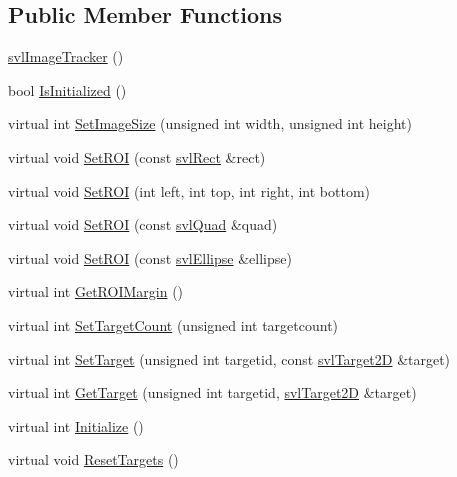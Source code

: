 \subsection*{Public Member Functions}
\begin{DoxyCompactItemize}
\item 
\hyperlink{classsvl_image_tracker_ab130e149fbc53c12361f616549f84c46}{svl\-Image\-Tracker} ()
\item 
bool \hyperlink{classsvl_image_tracker_a24e5e8a1a815d9e3623c66843d26df54}{Is\-Initialized} ()
\item 
virtual int \hyperlink{classsvl_image_tracker_afb9901eea52ba7bbdc2c70a0f4e5af09}{Set\-Image\-Size} (unsigned int width, unsigned int height)
\item 
virtual void \hyperlink{classsvl_image_tracker_aba04fa0ae482bc0c0cfcfcdc3608a4eb}{Set\-R\-O\-I} (const \hyperlink{structsvl_rect}{svl\-Rect} \&rect)
\item 
virtual void \hyperlink{classsvl_image_tracker_ab96f03b502eb23724acaf6c892981ac5}{Set\-R\-O\-I} (int left, int top, int right, int bottom)
\item 
virtual void \hyperlink{classsvl_image_tracker_ab65af89cd2f8498a27d02d4fe88265f6}{Set\-R\-O\-I} (const \hyperlink{structsvl_quad}{svl\-Quad} \&quad)
\item 
virtual void \hyperlink{classsvl_image_tracker_a43925e4cb1461046d3ac7f1f923e86ac}{Set\-R\-O\-I} (const \hyperlink{structsvl_ellipse}{svl\-Ellipse} \&ellipse)
\item 
virtual int \hyperlink{classsvl_image_tracker_a293f114b4d3cbf8bc32c2e5ce2fe8889}{Get\-R\-O\-I\-Margin} ()
\item 
virtual int \hyperlink{classsvl_image_tracker_a37dd0dd1b30ce96784258bb359a790d6}{Set\-Target\-Count} (unsigned int targetcount)
\item 
virtual int \hyperlink{classsvl_image_tracker_a33dbddc5e274df467a2f459652fa620f}{Set\-Target} (unsigned int targetid, const \hyperlink{structsvl_target2_d}{svl\-Target2\-D} \&target)
\item 
virtual int \hyperlink{classsvl_image_tracker_aaf99e4e4e69e44f6e57f97f8322a9e76}{Get\-Target} (unsigned int targetid, \hyperlink{structsvl_target2_d}{svl\-Target2\-D} \&target)
\item 
virtual int \hyperlink{classsvl_image_tracker_a530ac429c83a63e48e00eac848d4d2ec}{Initialize} ()
\item 
virtual void \hyperlink{classsvl_image_tracker_a29a3d1e5434ce42eb568aa861b33ce96}{Reset\-Targets} ()
\item 

\end{DoxyCompactItemize}
